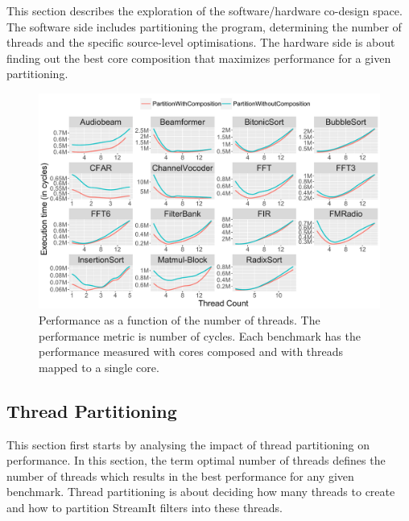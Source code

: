 This section describes the exploration of the software/hardware co-design space.
The software side includes partitioning the program, determining the number of threads and the specific source-level optimisations.
The hardware side is about finding out the best core composition that maximizes performance for a given partitioning.

\begin{figure}[t]
 \centering
    \includegraphics[width=1\textwidth]{streamit-paper/graphics/threadingmaybe4.pdf}
    \caption{Performance as a function of the number of threads. The performance metric is number of cycles. Each benchmark has the performance measured with cores composed and with threads mapped to a single core.}\label{fig:threadtrend}
\end{figure}

\subsection{Thread Partitioning}

This section first starts by analysing the impact of thread partitioning on performance.
In this section, the term optimal number of threads defines the number of threads which results in the best performance for any given benchmark.
Thread partitioning is about deciding how many threads to create and how to partition StreamIt filters into these threads.


